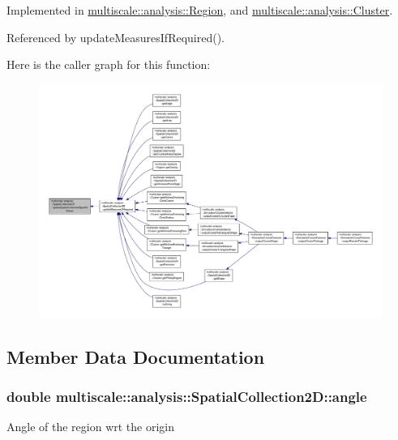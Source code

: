Implemented in \hyperlink{classmultiscale_1_1analysis_1_1Region_ac382fb7a5625d7ef573a311b8de8f248}{multiscale\-::analysis\-::\-Region}, and \hyperlink{classmultiscale_1_1analysis_1_1Cluster_aee8272e740fe640a6bf5260746d34080}{multiscale\-::analysis\-::\-Cluster}.



Referenced by update\-Measures\-If\-Required().



Here is the caller graph for this function\-:\nopagebreak
\begin{figure}[H]
\begin{center}
\leavevmode
\includegraphics[width=350pt]{classmultiscale_1_1analysis_1_1SpatialCollection2D_ad94bce09032b184ebfd5b5006217c683_icgraph}
\end{center}
\end{figure}




\subsection{Member Data Documentation}
\hypertarget{classmultiscale_1_1analysis_1_1SpatialCollection2D_ab452753ab21ee26732afb77a6478b3ce}{
\subsubsection[{angle}]{\setlength{\rightskip}{0pt plus 5cm}double multiscale\-::analysis\-::\-Spatial\-Collection2\-D\-::angle\hspace{0.3cm}{\ttfamily [protected]}}}\label{classmultiscale_1_1analysis_1_1SpatialCollection2D_ab452753ab21ee26732afb77a6478b3ce}
Angle of the region wrt the origin 

